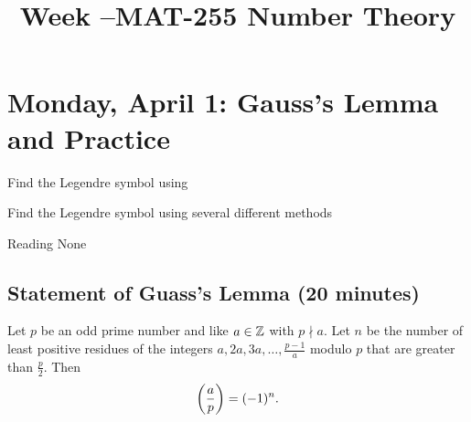 \documentclass[letterpaper, 11 pt]{ximera}
\title{Week \week--MAT-255 Number Theory}
\begin{document}
\section{Monday, April 1: Gauss's Lemma and Practice}

\begin{obj}
    \item Find the Legendre symbol using 
	\item Find the Legendre symbol using several different methods
\end{obj}


\begin{pre}
    \item[Reading] None
\end{pre}

\subsection{Statement of Guass's Lemma (20 minutes)}
\begin{lemma}\label{lem:gauss}
	Let $p$ be an odd prime number and like $a\in\mathbb Z$ with $p\nmid a$. Let $n$ be the number of least positive residues of the integers $a,2a,3a,\dots,\frac{p-1}{a}$ modulo $p$ that are greater than $\frac{p}{2}.$ Then \[\left(\frac{a}{p}\right)=(-1)^n.\]
\end{lemma}
\end{document}
